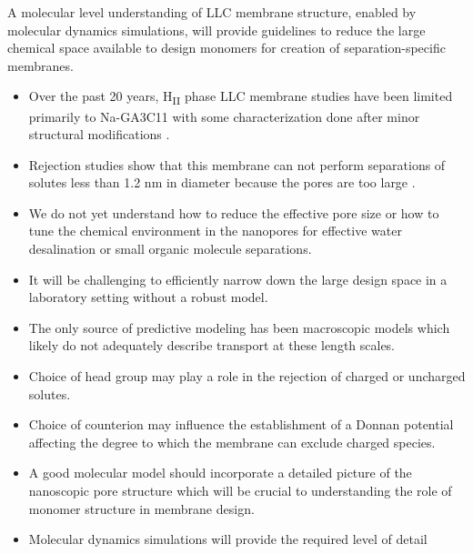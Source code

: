 \documentclass{article}
\begin{document}
  A molecular level understanding of LLC membrane structure, enabled by molecular
  dynamics simulations, will provide guidelines to reduce the large chemical space
  available to design monomers for creation of separation-specific membranes.
  \begin{itemize}
    \item Over the past 20 years, H\textsubscript{II} phase LLC membrane studies have been limited primarily
    to Na-GA3C11 with some characterization done after minor structural modifications
    \cite{resel_structural_2000}.
    \item Rejection studies show that this membrane can not perform separations of
    solutes less than 1.2 nm in diameter because the pores are too large \cite{zhou_supported_2005}.
    \item  We do not yet understand how to reduce the effective pore size or 
    how to tune the chemical environment in the nanopores for effective water
    desalination or small organic molecule separations.
    \item It will be challenging to efficiently narrow down the large design space in 
    a laboratory setting without a robust model.
    \item The only source of predictive modeling has been macroscopic models 
    which likely do not adequately describe transport at these length scales. %
    \item Choice of head group may play a role in the rejection of charged or uncharged solutes.
    \item Choice of counterion may influence the establishment of a Donnan potential
    affecting the degree to which the membrane can exclude charged species.
    \item A good molecular model should incorporate a detailed picture of the nanoscopic pore 
    structure which will be crucial to understanding the role of monomer structure in 
    membrane design.
    \item Molecular dynamics simulations will provide the required level of detail
  \end{itemize}
  
\end{document}

